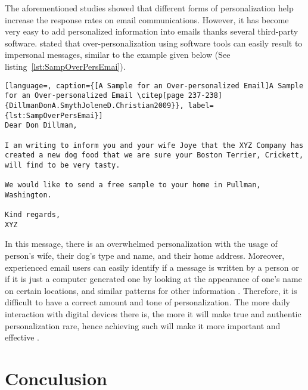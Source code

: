 The aforementioned studies showed that different forms of personalization help increase the response rates on email communications. However, it has become very easy to add personalized information into emails thanks several third-party software. \citet[page 237-238]{DillmanDonA.SmythJoleneD.Christian2009} stated that over-personalization using software tools can easily result to impersonal messages, similar to the example given below (See listing~\ref{lst:SampOverPersEmai}).
\vspace{1cm}

\clearpage


\begin{lstlisting}[language=, caption={[A Sample for an Over-personalized Email]A Sample for an Over-personalized Email \citep[page 237-238]{DillmanDonA.SmythJoleneD.Christian2009}}, label={lst:SampOverPersEmai}]
Dear Don Dillman,

I am writing to inform you and your wife Joye that the XYZ Company has created a new dog food that we are sure your Boston Terrier, Crickett, will find to be very tasty. 

We would like to send a free sample to your home in Pullman, Washington.

Kind regards,
XYZ
\end{lstlisting}

In this message, there is an overwhelmed personalization with the usage of person's wife, their dog's type and name, and their home address. Moreover, experienced email users can easily identify if a message is written by a person or if it is just a computer generated one by looking at the appearance of one's name on certain locations, and similar patterns for other information \citep[page 272]{DillmanDonA.SmythJoleneD.Christian2009}. Therefore, it is difficult to have a correct amount and tone of personalization. The more daily interaction with digital devices there is, the more it will make true and authentic personalization rare, hence achieving such will make it more important and effective \citep[page 238]{DillmanDonA.SmythJoleneD.Christian2009}.

\section{Conculusion}
\label{sec:2.4:Conc}

